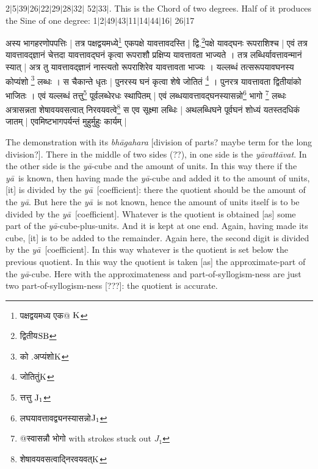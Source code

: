 \documentclass[11pt,a5paper]{book}
\def\yavattavat{\textit{y\=avatt\=avat}}
\def\ya{\textit{y\=a}}
\def\danda{$|$}
\begin{document}
2\danda 5\danda 39\danda 26\danda 22\danda 29\danda 28\danda 32\danda
52\danda 33\danda . This is the Chord of two degrees. Half of it produces the
Sine of one degree: 
1\danda 2\danda 49\danda 43\danda 11\danda 14\danda 44\danda 16\danda
26\danda 17 

\newpage
{\s अस्य भागहरणोपपत्तिः | 
तत्र पक्षद्वयमध्ये\footnote{{\s पक्षद्वयमध्य एक@ }${\rm K}$} एकपक्षे
यावत्तावदस्ति | 
द्वि.\footnote{{\s द्वितीय}${\rm SB}$}पक्षे यावद्घनः रूपराशिश्च | 
एवं तत्र यावत्तावद्ज्ञानं चेत्तदा यावत्तावद्घनं कृत्वा
रूपराशौ प्रक्षिप्य यावत्तावता भाज्यते । तत्र लब्धिर्यावत्तावन्मानं
स्यात् | 
अत्र तु यावत्तावद्ज्ञानं
नास्त्यतो रूपराशिरेव यावत्तावता भाज्यः । 
यल्लब्धं तत्सरूपयावघनस्य कोप्यंशो \footnote{{\s को .अप्यंशो}${\rm K}$} लब्धः । 
स चैकान्ते धृतः | 
पुनरस्य घनं कृत्वा 
शेषे जोतितं \footnote{{\s जोतितुं}${\rm K}$} । पुनरत्र यावत्तावता द्वितीयांको भाजितः । 
एवं यल्लब्धं तत्तु\footnote{{\s त्तत्तु }${\rm J_1}$}
पूर्वलब्धेरधः स्थापितम् | 
एवं लब्धयावत्तावद्घनस्यासन्नो\footnote{{\s लघयावत्तावद्व्यनस्यासन्नो}${\rm J_1}$} भागो 
\footnote{{\s @स्वासन्नौ भोगो } with strokes stuck out $J_1$} %
लब्धः %
अत्रासन्नता शेषावयवसत्वात् निरवयवत्वे\footnote{{\s शेषावयवसत्वाद्निरवयवत्}${\rm K}$} स एव सूक्ष्मा
लब्धिः | 
अथलब्धिघने पूर्वघनं शोध्यं यतस्तदधिकं जातम् | 
एवमिष्टभागपर्यन्तं मुहुर्मुहुः कार्यम् | }
\newpage 

The demonstration with its \textit{bh\=agahara} [division of parts? maybe term for the long division?]. There in 
the middle of two sides (??), in one side is the \yavattavat. 
In the other side is the \ya-cube
and the amount of units. In this way there if the \ya\ is known, then having
made the \ya-cube and added it to the amount of units, [it] is divided by 
the \ya\ [coefficient]:  there the quotient should be the amount of the \ya. But here the
\ya\ is not known, hence the amount of units itself is to be divided by the \ya\
[coefficient]. 
Whatever is the quotient is obtained [as] some part of the \ya-cube-plus-units.
And it is kept at one end. Again, having made its cube, [it] is to be added
to the remainder. Again here, the second digit is divided by the \ya\ [coefficient]. In this way
whatever is the quotient is set below the previous quotient. In this way
the quotient is taken [as] the approximate-part of the \ya-cube. Here with the 
approximateness and part-of-syllogism-ness are just two part-of-syllogism-ness [???]:
the quotient is accurate. 
\end{document}
